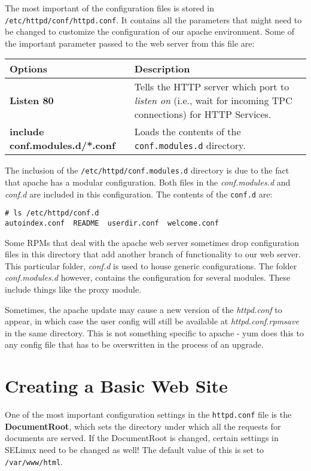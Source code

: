 \noindent
The most important of the configuration files is stored in \verb|/etc/httpd/conf/httpd.conf|. It contains all the parameters that might need to be changed to customize the configuration of our apache environment. Some of the important parameter passed to the web server from this file are:

\noindent
\begin{tabular}{lM{0.58}}
	\toprule
	\textbf{Options} &\textbf{Description}\\
	\midrule
	\textbf{Listen 80}	&Tells the HTTP server which port to \textit{listen on} (i.e., wait for incoming TPC connections) for HTTP Services. \\
	\textbf{include conf.modules.d/*.conf}	&Loads the contents of the \verb|conf.modules.d| directory.\\
	\bottomrule
\end{tabular}

\noindent
The inclusion of the \verb|/etc/httpd/conf.modules.d| directory is due to the fact that apache has a modular configuration. Both files in the \textit{conf.modules.d} and \textit{conf.d} are included in this configuration. The contents of the \verb|conf.d| are:

\vspace{-15pt}
\begin{verbatim}
# ls /etc/httpd/conf.d
autoindex.conf  README  userdir.conf  welcome.conf
\end{verbatim}
\vspace{-10pt}

\noindent
Some RPMs that deal with the apache web server sometimes drop configuration files in this directory that add another branch of functionality to our web server. This particular folder, \textit{conf.d} is used to house generic configurations. The folder \textit{conf.modules.d} however, contains the configuration for several modules. These include things like the proxy module.

Sometimes, the apache update may cause a new version of the \textit{httpd.conf} to appear, in which case the user config will still be available at \textit{httpd.conf.rpmsave} in the same directory. This is not something specific to apache - yum does this to any config file that has to be overwritten in the process of an upgrade. 

\section{Creating a Basic Web Site}
One of the most important configuration settings in the \verb|httpd.conf| file is the \textbf{DocumentRoot}, which sets the directory under which all the requests for documents are served. If the DocumentRoot is changed, certain settings in SELinux need to be changed as well! The default value of this is set to \verb|/var/www/html|. 

